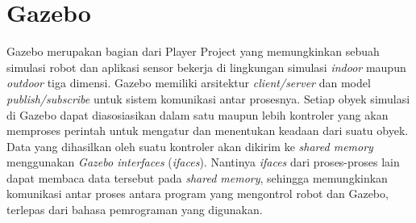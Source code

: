 \section{Gazebo}
\label{sec:gazebo}

Gazebo \citep{cit:koenig2004} merupakan bagian dari Player Project \citep{cit:gerkey2003} yang memungkinkan sebuah simulasi robot dan aplikasi sensor bekerja di lingkungan simulasi \emph{indoor} maupun \emph{outdoor} tiga dimensi.
Gazebo memiliki arsitektur \emph{client/server} dan model \emph{publish/subscribe} untuk sistem komunikasi antar prosesnya.
Setiap obyek simulasi di Gazebo dapat diasosiasikan dalam satu maupun lebih kontroler yang akan memproses perintah untuk mengatur dan menentukan keadaan dari suatu obyek.
Data yang dihasilkan oleh suatu kontroler akan dikirim ke \emph{shared memory} menggunakan \emph{Gazebo interfaces} (\emph{ifaces}).
Nantinya \emph{ifaces} dari proses-proses lain dapat membaca data tersebut pada \emph{shared memory}, sehingga memungkinkan komunikasi antar proses antara program yang mengontrol robot dan Gazebo, terlepas dari bahasa pemrograman yang digunakan.

